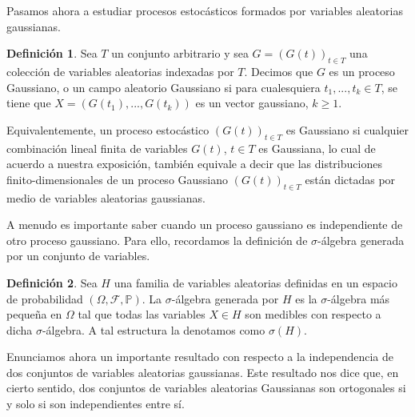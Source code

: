 \documentclass[letterpaper,twoside]{book}
\newcommand{\F}{\mathcal{F}}
\renewcommand{\P}{\mathbb{P}}
\newcommand{\1}{\mathds{1}}
\theoremstyle{definition}
\newtheorem{dfn}{Definición}
\theoremstyle{definition}
\theoremstyle{definition}
\theoremstyle{definition}
\theoremstyle{definition}
\theoremstyle{definition}
\theoremstyle{definition}
\begin{document}
 Pasamos ahora a estudiar procesos estocásticos formados por variables aleatorias gaussianas.
\begin{dfn} 
 Sea $T$ un conjunto arbitrario y sea $G=(G(t))_{t\in T}$ una colección de variables aleatorias indexadas por $T$. Decimos que $G$ es un proceso Gaussiano, o un campo aleatorio Gaussiano si para cualesquiera $t_1,...,t_k\in T$, se tiene que $X=(G(t_1),...,G(t_k))$ es un vector gaussiano, $k\geq1$. 
\end{dfn}

Equivalentemente, un proceso estocástico $(G(t))_{t\in T}$ es Gaussiano si cualquier combinación lineal finita de variables $G(t)$, $t\in T$ es Gaussiana, lo cual de acuerdo a nuestra exposición, también equivale a decir que las distribuciones finito-dimensionales de un proceso Gaussiano $(G(t))_{t\in T}$ están dictadas por medio de variables aleatorias gaussianas.

A menudo es importante saber cuando un proceso gaussiano es independiente de otro proceso gaussiano. Para ello, recordamos la definición de $\sigma$-álgebra generada por un conjunto de variables.

\begin{dfn} 
 Sea $H$ una familia de variables aleatorias definidas en un espacio de probabilidad $(\Omega, \F, \P)$. La $\sigma$-álgebra generada por $H$ es la $\sigma$-álgebra más pequeña en $\Omega$ tal que todas las variables $X\in H$ son medibles con respecto a dicha $\sigma$-álgebra. A tal estructura la denotamos como $\sigma(H)$.  
 \end{dfn}
Enunciamos ahora un importante resultado con respecto a la independencia de dos conjuntos de variables aleatorias gaussianas. Este resultado nos dice que, en cierto sentido, dos conjuntos de variables aleatorias Gaussianas son ortogonales si y solo si son independientes entre sí. 
\end{document}
